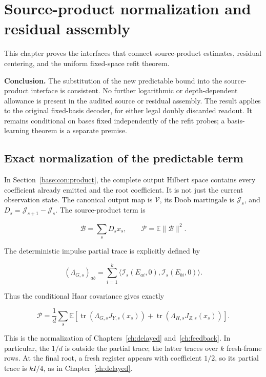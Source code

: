 \documentclass[11pt,oneside,openany,a4paper]{book}
\numberwithin{equation}{chapter}
\theoremstyle{definition}
\theoremstyle{remark}
\begin{document}
\chapter{Source-product normalization and residual assembly}\label{ch:interfaces}
This chapter proves the interfaces that connect source-product estimates, residual centering, and the uniform fixed-space refit theorem.

\textbf{Conclusion.} The substitution of the new predictable bound into the source-product interface is consistent. No further logarithmic or depth-dependent allowance is present in the audited source or residual assembly. The result applies to the original fixed-basis decoder, for either legal doubly discarded readout. It remains conditional on bases fixed independently of the refit probes; a basis-learning theorem is a separate premise.

\section{Exact normalization of the predictable term}\label{interfaces:exact-normalization-of-the-predictable-term}

In Section~\ref{base:con:product}, the complete output Hilbert space contains every coefficient already emitted and the root coefficient. It is not just the current observation state. The canonical output map is \(\mathcal V\), its Doob martingale is \(\mathcal J_s\), and \(D_s=\mathcal J_{s+1}-\mathcal J_s\). The source-product term is

\[
\mathcal B=\sum_s D_sx_s,\qquad
\mathcal P=\mathbb E\|\mathcal B\|^2.
\]

The deterministic impulse partial trace is explicitly defined by

\[
(\Lambda_{G,s})_{ab}
=\sum_{i=1}^k
\langle\mathcal I_s(E_{ai},0),\mathcal I_s(E_{bi},0)\rangle.
\]

Thus the conditional Haar covariance gives exactly

\[
\mathcal P=\frac1d\sum_s\mathbb E\left[
\operatorname{tr}(\Lambda_{G,s}J_{Y,s}(x_s))
+\operatorname{tr}(\Lambda_{H,s}J_{Z,s}(x_s))\right].
\]

This is the normalization of Chapters~\ref{ch:delayed} and~\ref{ch:feedback}. In particular, the \(1/d\) is outside the partial trace; the latter traces over \(k\) fresh-frame rows. At the final root, a fresh register appears with coefficient \(1/2\), so its partial trace is \(kI/4\), as in Chapter~\ref{ch:delayed}.
\end{document}
